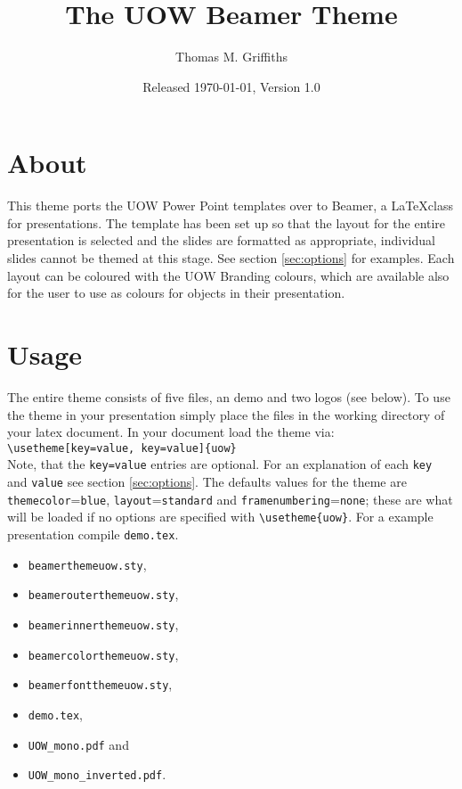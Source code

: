 \documentclass[a4paper,oneside,12pt]{article}
\title{\textsf{The UOW Beamer Theme}}
\author{Thomas M. Griffiths}
\date{Released \today, Version 1.0}
\newcommand{\key}[1]{\texttt{\color{UOWorange}#1}}
\newcommand{\val}[1]{\texttt{\color{UOWblue}#1}}
\newcommand{\command}[1]{\texttt{\color{UOWdarkgreen}#1}}
\begin{document}
\maketitle

\section{About}
This theme ports the UOW Power Point templates over to Beamer, a \LaTeX class for presentations. The template has been set up so that the layout for the entire presentation is selected and the slides are formatted as appropriate, individual slides cannot be themed at this stage. See section \ref{sec:options} for examples. Each layout can be coloured with the UOW Branding colours, which are available also for the user to use as colours for objects in their presentation.

\section{Usage}
The entire theme consists of five files, an demo and two logos (see below). To use the theme in your presentation simply place the files in the working directory of your latex document. In your document load the theme via:\\

\command{\textbackslash{}usetheme[\key{key}=\val{value}, \key{key}=\val{value}]\{uow\}}\\

\noindent Note, that the \command{\key{key}=\val{value}} entries are optional. For an explanation of each \key{key} and \val{value} see section \ref{sec:options}. The defaults values for the theme are \key{themecolor}=\val{blue}, \key{layout}=\val{standard} and \key{framenumbering}=\val{none}; these are what will be loaded if no options are specified with \command{\textbackslash{}usetheme\{uow\}}. For a example presentation compile \texttt{demo.tex}.
\begin{multicols}{2}
\begin{itemize}
   \item \texttt{\colorbox{UOWgrey!20}{beamerthemeuow.sty}},
   \item \texttt{\colorbox{UOWgrey!20}{beamerouterthemeuow.sty}},
   \item \texttt{\colorbox{UOWgrey!20}{beamerinnerthemeuow.sty}},
   \item \texttt{\colorbox{UOWgrey!20}{beamercolorthemeuow.sty}},
   \item \texttt{\colorbox{UOWgrey!20}{beamerfontthemeuow.sty}},
   \item \texttt{\colorbox{UOWgrey!20}{demo.tex}},
   \item \texttt{\colorbox{UOWgrey!20}{UOW\_mono.pdf}} and
   \item \texttt{\colorbox{UOWgrey!20}{UOW\_mono\_inverted.pdf}}.
\end{itemize}
\end{multicols}
\end{document}
